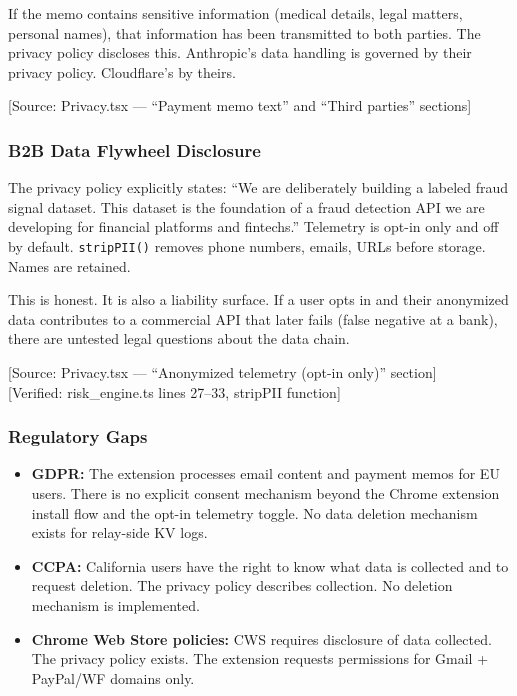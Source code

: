 \documentclass[11pt, letterpaper]{article}
\newcommand{\source}[1]{\textcolor{citation}{[Source: #1]}}
\newcommand{\verified}[1]{\textcolor{citation}{[Verified: #1]}}
\begin{document}
  If the memo contains sensitive information (medical details, legal matters, personal names), that information has been transmitted to both parties. The privacy policy discloses this. Anthropic's data handling is governed by their privacy policy. Cloudflare's by theirs.

  \source{Privacy.tsx --- ``Payment memo text'' and ``Third parties'' sections}

  \subsubsection{B2B Data Flywheel Disclosure}

  The privacy policy explicitly states: ``We are deliberately building a labeled fraud signal dataset. This dataset is the foundation of a fraud detection API we are developing for financial platforms and fintechs.'' Telemetry is opt-in only and off by default. \texttt{stripPII()} removes phone numbers, emails, URLs before storage. Names are retained.

  This is honest. It is also a liability surface. If a user opts in and their anonymized data contributes to a commercial API that later fails (false negative at a bank), there are untested legal questions about the data chain.

  \source{Privacy.tsx --- ``Anonymized telemetry (opt-in only)'' section}\\
  \verified{risk\_engine.ts lines 27--33, stripPII function}

  \subsubsection{Regulatory Gaps}

  \begin{itemize}[nosep]
    \item \textbf{GDPR:} The extension processes email content and payment memos for EU users. There is no explicit consent mechanism beyond the Chrome extension install flow and the opt-in telemetry toggle. No data deletion mechanism exists for relay-side KV logs.
    \item \textbf{CCPA:} California users have the right to know what data is collected and to request deletion. The privacy policy describes collection. No deletion mechanism is implemented.
    \item \textbf{Chrome Web Store policies:} CWS requires disclosure of data collected. The privacy policy exists. The extension requests permissions for Gmail + PayPal/WF domains only.
  \end{itemize}
\end{document}
